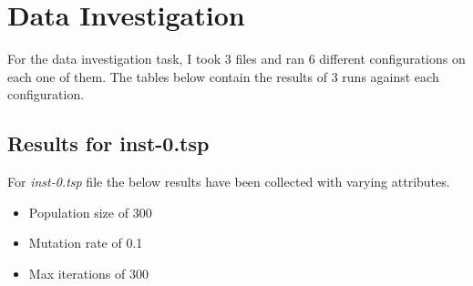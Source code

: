 \section{Data Investigation}

For the data investigation task, I took 3 files and ran 6 different configurations on each one of them. The tables below contain the results of 3 runs against each configuration.

\subsection{Results for inst-0.tsp}
For \textit{inst-0.tsp} file the below results have been collected with varying attributes.

\begin{itemize}
  \item Population size of 300
  \item Mutation rate of 0.1
  \item Max iterations of 300
\end{itemize}

